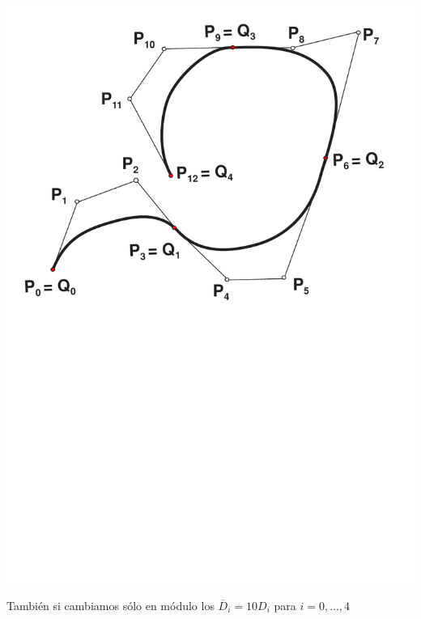 \documentclass[ebook,oneside]{memoir}
\begin{document}
\begin{center}
\includegraphics[scale=0.45]{3_29.pdf}
\end{center}

\vspace{0.3cm}

Tambi\'{e}n si cambiamos s\'{o}lo en m\'{o}dulo los $\overline{D}_i=10D_i$ para $i=0,\ldots,4$
\end{document}
